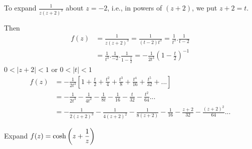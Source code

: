 \begin{solution}
To expand $\frac{1}{z(z+2)^{3}}$ about $z=-2$, i.e., in powers
of $(z+2)$, we put $z+2=t$.

\noindent
Then
\begin{align*} f(z)&=\frac{1}{z(z+2)^{3}}=\frac{1}{(t-2)t^{3}}=\frac{1}{t^{3}}.\frac{1}{t-2} \\
&=\frac{1}{t^{3}}.\frac{1}{-2}.\frac{1}{1-\frac{t}{2}}=-\frac{1}{2t^{3}}(1-\frac{t}{2})^{-1} 
\end{align*}
$0<|z+2|<1$ or $0<|t|<1$
\begin{align*}
f(z)&=-\frac{1}{2t^{3}}[1+\frac{t}{2}+\frac{t^{2}}{4}+\frac{t^{3}}{8}+\frac{t^{4}}{16}+\frac{t^{5}}{32}+...] \\
&=-\frac{1}{2t^{3}}-\frac{1}{4t^{2}}-\frac{1}{8t}-\frac{1}{16}-\frac{t}{32}-\frac{t^{2}}{64}... \\
&=-\frac{1}{2(z+2)^{3}}-\frac{1}{4(z+2)^{2}}-\frac{1}{8(z+2)}-\frac{1}{16}-\frac{z+2}{32}-\frac{(z+2)^{2}}{64}... 
\end{align*}
\end{solution}
\begin{example}
Expand $\displaystyle f(z) = \cosh\left(z+\frac{1}{z}\right)$
\end{example}

